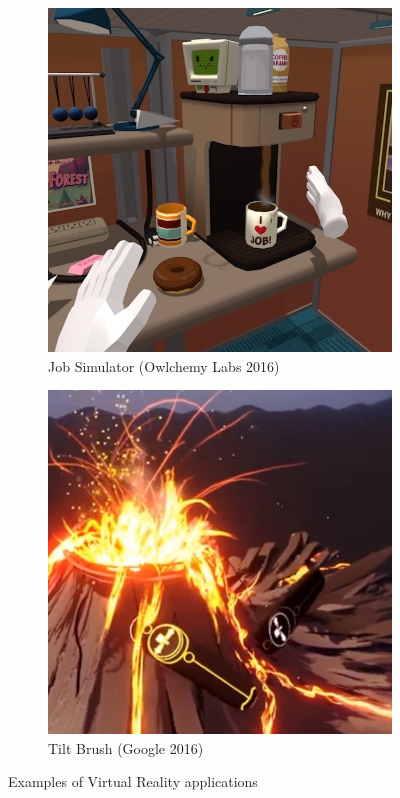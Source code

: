 \documentclass[12pt]{article}
\begin{document}
\begin{figure}
\centering
\begin{subfigure}{.5\textwidth}
  \centering
  \includegraphics[width=.95\linewidth]{jobsimulator.jpg}
  \caption{Job Simulator (Owlchemy Labs 2016)}
\end{subfigure}%
\begin{subfigure}{.5\textwidth}
  \centering
  \includegraphics[width=.95\linewidth]{tiltbrush.jpg}
  \caption{Tilt Brush (Google 2016)}
\end{subfigure}
\caption{Examples of Virtual Reality applications}
\end{figure}
\end{document}
